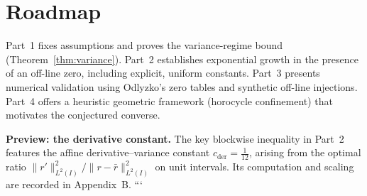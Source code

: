 \section{Roadmap}

Part~1 fixes assumptions and proves the variance-regime bound (Theorem~\ref{thm:variance}).
Part~2 establishes exponential growth in the presence of an off-line zero, including explicit,
uniform constants.  Part~3 presents numerical validation using Odlyzko’s zero tables and
synthetic off-line injections.  Part~4 offers a heuristic geometric framework (horocycle
confinement) that motivates the conjectured converse.

\medskip
\noindent
\textbf{Preview: the derivative constant.}
The key blockwise inequality in Part~2 features the affine derivative–variance constant
$c_{\mathrm{der}}=\tfrac{1}{12}$, arising from the optimal ratio
$\|r'\|_{L^2(I)}^2/\|r-\bar r\|_{L^2(I)}^2$ on unit intervals.  Its computation and scaling
are recorded in Appendix~B.
```
